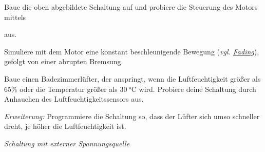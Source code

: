 \begin{aufgabe}
	
	Baue die oben abgebildete Schaltung auf und probiere die Steuerung des Motors mittels 
	
	 aus.
	
	Simuliere mit dem Motor eine konstant beschleunigende Bewegung (\emph{vgl. \href{sec:pwm}{Fading}}), gefolgt von einer abrupten Bremsung.
\end{aufgabe}

\begin{projekt}[Badezimmerlüfter]\label{proj:badezimmerluefter}
	Baue einen Badezimmerlüfter, der anspringt, wenn die Luftfeuchtigkeit größer als 65\% oder die Temperatur größer als $\SI{30}{\celsius}$ wird. Probiere deine Schaltung durch Anhauchen des Luftfeuchtigkeitssensors aus.
	
	\emph{Erweiterung:} Programmiere die Schaltung so, dass der Lüfter sich umso schneller dreht, je höher die Luftfeuchtigkeit ist.
\end{projekt}

\medskip
\emph{Schaltung mit externer Spannungsquelle}
\medskip

